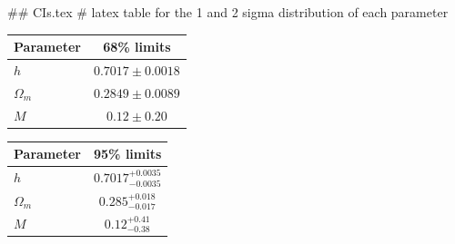 ## CIs.tex
# latex table for the 1 and 2 sigma distribution of each parameter

\begin{tabular} { l  c}
 Parameter &  68\% limits\\
\hline
{\boldmath$h              $} & $0.7017\pm 0.0018          $\\
{\boldmath$\Omega_m       $} & $0.2849\pm 0.0089          $\\
{\boldmath$M              $} & $0.12\pm 0.20              $\\
\hline
\end{tabular}

\begin{tabular} { l  c}
 Parameter &  95\% limits\\
\hline
{\boldmath$h              $} & $0.7017^{+0.0035}_{-0.0035}$\\
{\boldmath$\Omega_m       $} & $0.285^{+0.018}_{-0.017}   $\\
{\boldmath$M              $} & $0.12^{+0.41}_{-0.38}      $\\
\hline
\end{tabular}
